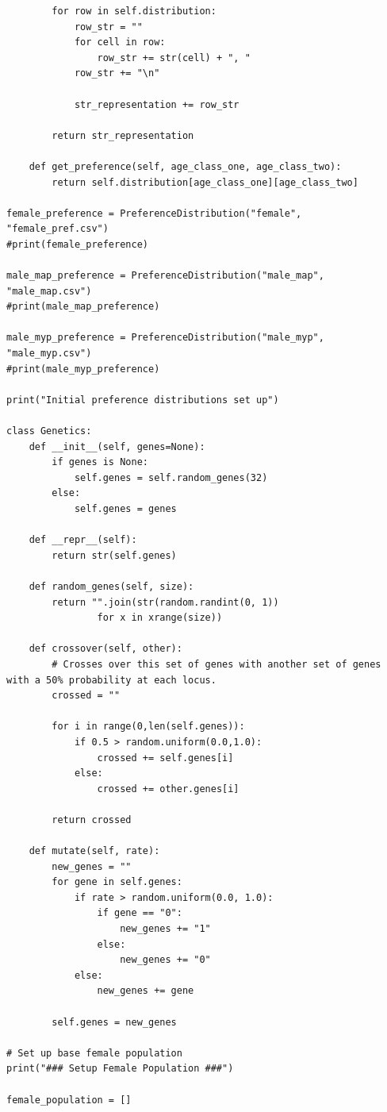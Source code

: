 \documentclass[authoryearcitations]{UoYCSproject}
\begin{document}
\begin{landscape}
\begin{verbatim}
        for row in self.distribution:
            row_str = ""
            for cell in row:
                row_str += str(cell) + ", "
            row_str += "\n"

            str_representation += row_str

        return str_representation

    def get_preference(self, age_class_one, age_class_two):
        return self.distribution[age_class_one][age_class_two]

female_preference = PreferenceDistribution("female", "female_pref.csv")
#print(female_preference)

male_map_preference = PreferenceDistribution("male_map", "male_map.csv")
#print(male_map_preference)

male_myp_preference = PreferenceDistribution("male_myp", "male_myp.csv")
#print(male_myp_preference)

print("Initial preference distributions set up")

class Genetics:
    def __init__(self, genes=None):
        if genes is None:
            self.genes = self.random_genes(32)
        else:
            self.genes = genes

    def __repr__(self):
        return str(self.genes)

    def random_genes(self, size):
        return "".join(str(random.randint(0, 1))
                for x in xrange(size))

    def crossover(self, other):
        # Crosses over this set of genes with another set of genes with a 50% probability at each locus.
        crossed = ""

        for i in range(0,len(self.genes)):
            if 0.5 > random.uniform(0.0,1.0):
                crossed += self.genes[i]
            else:
                crossed += other.genes[i]

        return crossed

    def mutate(self, rate):
        new_genes = ""
        for gene in self.genes:
            if rate > random.uniform(0.0, 1.0):
                if gene == "0":
                    new_genes += "1"
                else:
                    new_genes += "0"
            else:
                new_genes += gene

        self.genes = new_genes

# Set up base female population
print("### Setup Female Population ###")

female_population = []


\end{verbatim}
\end{landscape}
\end{document}
